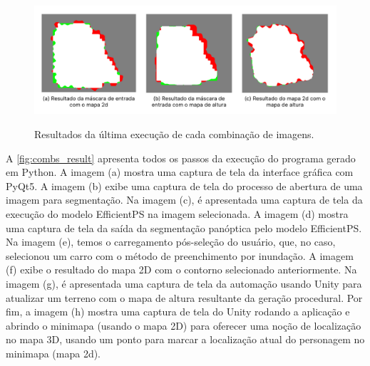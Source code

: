 \begin{figure}[!ht]
	\centering
    \caption{Resultados da última execução de cada combinação de imagens.}
	\includegraphics[width=\textwidth]{figures/comb_results_final.png}
	\label{fig:result_final}
\end{figure}

A \cref{fig:combs_result} apresenta todos os passos da execução do programa gerado em Python. A imagem (a) mostra uma captura de tela da interface gráfica com PyQt5. A imagem (b) exibe uma captura de tela do processo de abertura de uma imagem para segmentação. Na imagem (c), é apresentada uma captura de tela da execução do modelo EfficientPS na imagem selecionada. A imagem (d) mostra uma captura de tela da saída da segmentação panóptica pelo modelo EfficientPS. Na imagem (e), temos o carregamento pós-seleção do usuário, que, no caso, selecionou um carro com o método de preenchimento por inundação. A imagem (f) exibe o resultado do mapa 2D com o contorno selecionado anteriormente. Na imagem (g), é apresentada uma captura de tela da automação usando Unity para atualizar um terreno com o mapa de altura resultante da geração procedural. Por fim, a imagem (h) mostra uma captura de tela do Unity rodando a aplicação e abrindo o minimapa (usando o mapa 2D) para oferecer uma noção de localização no mapa 3D, usando um ponto para marcar a localização atual do personagem no minimapa (mapa 2d).


